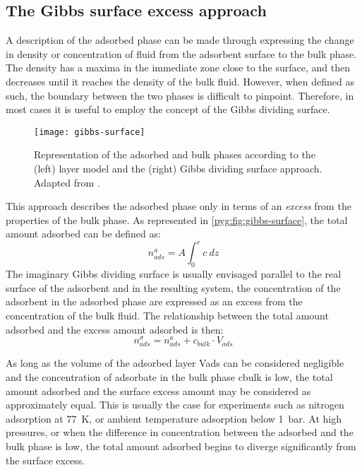 \subsection{The Gibbs surface excess approach}\label{pyg:models:gibbs}

A description of the adsorbed phase can be made through
expressing the change in density or concentration of fluid
from the adsorbent surface to the bulk phase. The density
has a maxima in the immediate zone close to the surface, and then
decreases until it reaches the density of the bulk fluid.
However, when defined as such, the boundary between the
two phases is difficult to pinpoint.
Therefore, in most cases it is useful to employ the concept
of the Gibbs dividing surface.

\begin{figure}[htb]
	\centering
	\texttt{[image: gibbs-surface]}
	\caption{
		Representation of the adsorbed and bulk phases according to
		the (left) layer model and the (right) Gibbs dividing surface
		approach. Adapted from \citet{rouquerolAdsorptionPowdersPorous2013}.
	}\label{pyg:fig:gibbs-surface}
\end{figure}

This approach describes the adsorbed phase only in terms
of an \textit{excess} from the properties of the bulk phase.
As represented in \autoref{pyg:fig:gibbs-surface}, the total
amount adsorbed can be defined as:
%
\begin{equation}
	n_{ads}^{a} = A \int_0^r c\ dz
\end{equation}
%
The imaginary Gibbs dividing surface is usually envisaged parallel to
the real surface of the adsorbent and in the resulting system, the
concentration of the adsorbent in the adsorbed phase are
expressed as an excess from the concentration of the bulk fluid.
The relationship between the total amount adsorbed and the
excess amount adsorbed is then:
%
\begin{equation}\label{pyg:eqn:total-excess}
	n_{ads}^{\sigma} = n_{ads}^{a} +  c_{bulk} \cdot V_{ads}
\end{equation}

As long as the volume of the adsorbed layer \gls{Vads} can be
considered negligible and the concentration of adsorbate in the bulk
phase \gls{cbulk} is low, the total amount adsorbed and the surface
excess amount may be considered as approximately equal.
This is usually the case for experiments such as nitrogen
adsorption at \SI{77}{\kelvin}, or ambient temperature adsorption
below \SI{1}{\bar}.
At high pressures, or when the difference in concentration between
the adsorbed and the bulk phase is low, the total amount adsorbed
begins to diverge significantly from the surface excess.

